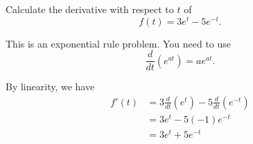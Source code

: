 \documentclass{ximera}
\author{Emma Smith Zbarsky}
\begin{document}
\begin{exercise}

Calculate the derivative with respect to $t$ of \[f(t) = 3e^t-5e^{-t}.\]


\begin{hint}
This is an exponential rule problem. You need to use
\[\frac{d}{dt}\left(e^{at}\right) = ae^{at}.\]
\end{hint}


\begin{hint}
By linearity, we have \begin{align*}
f'(t) &= 3\frac{d}{dt}\left(e^t\right)- 5\frac{d}{dt}\left(e^{-t}\right) \\
&= 3e^t -5 (-1)e^{-t} \\
&= \boxed{3e^t+5e^{-t}}
\end{align*}
\end{hint}


\begin{multipleChoice}
\end{multipleChoice}

\end{exercise}
\end{document}
